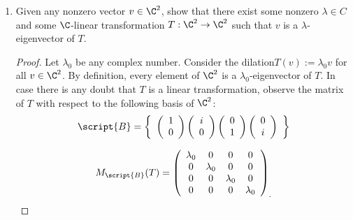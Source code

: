 \documentclass[letterpaper]{article}
\begin{document}
\begin{enumerate}
\item Given any nonzero vector $v \in \C^2$, show that there exist some nonzero $\lambda \in C$ and some
$\C$-linear transformation $T : \C^2\to\C^2$ such that $v$ is a $\lambda$-eigenvector of $T$.
\begin{proof}
Let $\lambda_0$ be any complex number. Consider the dilation\footnotemark $T(v):=\lambda_0v$ for all $v\in\C^2$. By definition, every element of $\C^2$ is a $\lambda_0$-eigenvector of $T$. In case there is any doubt that $T$ is a linear transformation, observe the matrix of $T$ with respect to the following basis of $\C^2$:
\[\script{B}=\left\lbrace
\begin{array}{cccc}
\left(\begin{array}{c}
1\\
0
\end{array}\right)
\left(\begin{array}{c}
i\\
0
\end{array}\right)
\left(\begin{array}{c}
0\\
1
\end{array}\right)
\left(\begin{array}{c}
0\\
i
\end{array}\right)
\end{array}\right\rbrace\]

\[M_\script{B}(T)=\left(
\begin{array}{cccc}
\lambda_0 & 0 & 0 & 0 \\
0 & \lambda_0 & 0 & 0 \\
0 & 0 & \lambda_0 & 0 \\ 
0 & 0 & 0 & \lambda_0 \\ 
\end{array}
\right)_.\]
\end{proof}
\end{enumerate}

\end{document}
